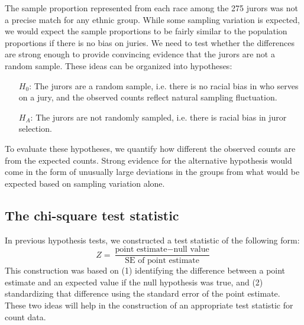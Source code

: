 The sample proportion represented from each race among the 275 jurors was not a precise match for any ethnic group. While some sampling variation is expected, we would expect the sample proportions to be fairly similar to the population proportions if there is no bias on juries. We need to test whether the differences are strong enough to provide convincing evidence that the jurors are not a random sample. These ideas can be organized into hypotheses:
\begin{itemize}
\setlength{\itemsep}{0mm}
\item[$H_0$:] The jurors are a random sample, i.e. there is no racial bias in who serves on a jury, and the observed counts reflect natural sampling fluctuation.
\item[$H_A$:] The jurors are not randomly sampled, i.e. there is racial bias in juror selection.
\end{itemize}
To evaluate these hypotheses, we quantify how different the observed counts are from the expected counts. Strong evidence for the alternative hypothesis would come in the form of unusually large deviations in the groups from what would be expected based on sampling variation alone.


\subsection{The chi-square test statistic}
\label{chiSquareTestStatistic}

In previous hypothesis tests, we constructed a test statistic of the following form:
$$ Z = \frac{\text{point estimate} - \text{null value}}{\text{SE of point estimate}} $$
This construction was based on (1) identifying the difference between a point estimate and an expected value if the null hypothesis was true, and (2) standardizing that difference using the standard error of the point estimate. These two ideas will help in the construction of an appropriate test statistic for count data.


